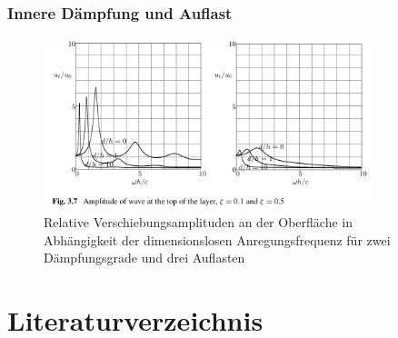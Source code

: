 \documentclass[hyperref={pdfpagemode=FullScreen, colorlinks=false}]{beamer}
\begin{document}
\begin{frame}
\frametitle{Innere Dämpfung und Auflast}

\begin{figure}
\includegraphics[width=0.85\textwidth]{fig_img/earthquake_damped_top_load.png}
\caption*{Relative Verschiebungsamplituden an der Oberfläche in Abhängigkeit der dimensionslosen Anregungsfrequenz für zwei Dämpfungsgrade und drei Auflasten \cite{Verruijt2010}}
\end{figure}

\end{frame}


\section*{Literaturverzeichnis}

\begin{frame}[allowframebreaks]{}
	\printbibliography
\end{frame}
\end{document}
